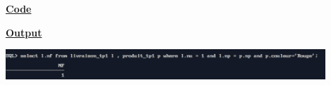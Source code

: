 \newpage
{}

\textbf{\underline{Code}}


\vspace{1cm}
\textbf{\underline{Output}}
\vspace{1cm}
\begin{center}
    \includegraphics[width=0.9\textwidth]{Questions/q17/q17.png}
\end{center}


